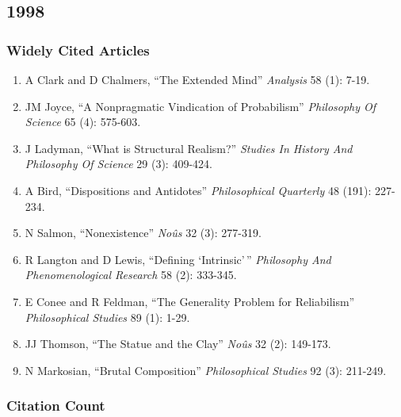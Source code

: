 \documentclass[
  10pt,
  letterpaper,
  DIV=11,
  numbers=noendperiod,
  twoside]{scrartcl}
\providecommand{\tightlist}{%
  \setlength{\itemsep}{0pt}\setlength{\parskip}{0pt}}\usepackage{longtable,booktabs,array}
\begin{document}
\newpage

\subsection{1998}\label{section-22}

\subsubsection*{Widely Cited Articles}\label{widely-cited-articles-22}

\begin{enumerate}
\def\labelenumi{\arabic{enumi}.}
\tightlist
\item
  A Clark and D Chalmers, ``The Extended Mind'' \emph{Analysis} 58 (1):
  7-19.
\item
  JM Joyce, ``A Nonpragmatic Vindication of Probabilism''
  \emph{Philosophy Of Science} 65 (4): 575-603.
\item
  J Ladyman, ``What is Structural Realism?'' \emph{Studies In History
  And Philosophy Of Science} 29 (3): 409-424.
\item
  A Bird, ``Dispositions and Antidotes'' \emph{Philosophical Quarterly}
  48 (191): 227-234.
\item
  N Salmon, ``Nonexistence'' \emph{Noûs} 32 (3): 277-319.
\item
  R Langton and D Lewis, ``Defining `Intrinsic'\,'' \emph{Philosophy And
  Phenomenological Research} 58 (2): 333-345.
\item
  E Conee and R Feldman, ``The Generality Problem for Reliabilism''
  \emph{Philosophical Studies} 89 (1): 1-29.
\item
  JJ Thomson, ``The Statue and the Clay'' \emph{Noûs} 32 (2): 149-173.
\item
  N Markosian, ``Brutal Composition'' \emph{Philosophical Studies} 92
  (3): 211-249.
\end{enumerate}

\subsubsection*{Citation Count}\label{citation-count-22}
\end{document}

